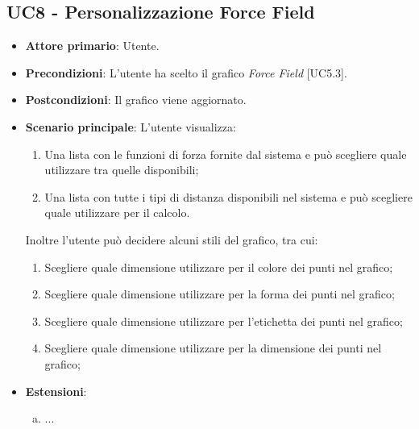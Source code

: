 \subsection{UC8 - Personalizzazione Force Field}
\begin{itemize}
	\item \textbf{Attore primario}: Utente.
	
	\item \textbf{Precondizioni}: L'utente ha scelto il grafico \textit{Force Field} [UC5.3].
	
	\item \textbf{Postcondizioni}: Il grafico viene aggiornato.
	
	\item \textbf{Scenario principale}: L'utente visualizza:
	
\begin{enumerate}
	\item Una lista con le funzioni di forza fornite dal sistema e può scegliere quale utilizzare tra quelle disponibili; 
	\item Una lista con tutte i tipi di distanza disponibili nel sistema e può scegliere quale utilizzare per il calcolo. 
\end{enumerate}	
	Inoltre l'utente può decidere alcuni stili del grafico, tra cui:
		\begin{enumerate}
			\item Scegliere quale dimensione utilizzare per il colore dei punti nel grafico;
				
			\item Scegliere quale dimensione utilizzare per la forma dei punti nel grafico;
			
			\item Scegliere quale dimensione utilizzare per l'etichetta dei punti nel grafico;
			
			\item Scegliere quale dimensione utilizzare per la dimensione dei punti nel grafico;
				
		\end{enumerate}
		
	\item \textbf{Estensioni}:
	\begin{enumerate}[(a)]
		\item ...
	\end{enumerate}
\end{itemize}

